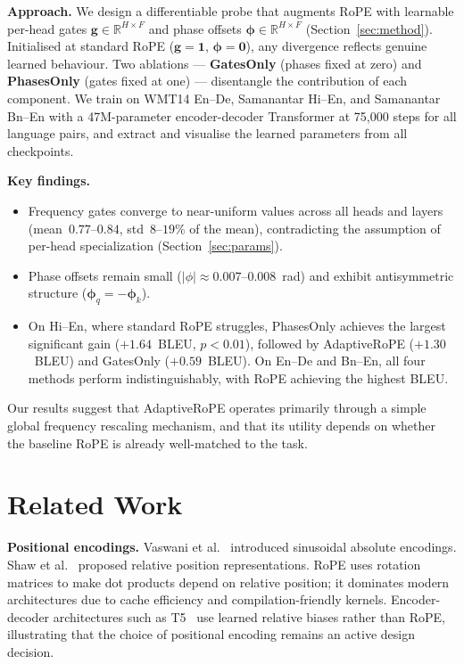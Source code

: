 \documentclass[conference]{IEEEtran}
\begin{document}
\textbf{Approach.} We design a differentiable probe that augments RoPE with
learnable per-head gates $\mathbf{g} \in \mathbb{R}^{H \times F}$ and phase
offsets $\boldsymbol{\phi} \in \mathbb{R}^{H \times F}$
(Section~\ref{sec:method}). Initialised at standard RoPE ($\mathbf{g}=\mathbf{1}$,
$\boldsymbol{\phi}=\mathbf{0}$), any divergence reflects genuine learned
behaviour. Two ablations --- \textbf{GatesOnly} (phases fixed at zero) and
\textbf{PhasesOnly} (gates fixed at one) --- disentangle the contribution of
each component. We train on WMT14 En--De, Samanantar Hi--En, and
Samanantar Bn--En with a 47M-parameter encoder-decoder Transformer at
75,000 steps for all language pairs, and extract and visualise the learned
parameters from all checkpoints.

\textbf{Key findings.}
\begin{itemize}
  \item Frequency gates converge to near-uniform values across all heads and
        layers (mean~$0.77$--$0.84$, std~$8$--$19\%$ of the mean),
        contradicting the assumption of per-head specialization
        (Section~\ref{sec:params}).
  \item Phase offsets remain small ($|\phi| \approx 0.007$--$0.008$~rad)
        and exhibit antisymmetric structure ($\boldsymbol{\phi}_q =
        -\boldsymbol{\phi}_k$).
  \item On Hi--En, where standard RoPE struggles, PhasesOnly achieves the
        largest significant gain ($+1.64$~BLEU, $p<0.01$), followed by
        AdaptiveRoPE ($+1.30$~BLEU) and GatesOnly ($+0.59$~BLEU).
        On En--De and Bn--En, all four methods perform indistinguishably,
        with RoPE achieving the highest BLEU.
\end{itemize}

Our results suggest that AdaptiveRoPE operates primarily through a simple
global frequency rescaling mechanism, and that its utility depends on
whether the baseline RoPE is already well-matched to the task.

\section{Related Work}
\label{sec:related}

\textbf{Positional encodings.} Vaswani et al.~\cite{vaswani2017attention}
introduced sinusoidal absolute encodings. Shaw et al.~\cite{shaw2018self}
proposed relative position representations. RoPE
\cite{su2021roformer} uses rotation matrices to make dot products depend on
relative position; it dominates modern architectures due to cache efficiency
and compilation-friendly kernels. Encoder-decoder architectures such as
T5~\cite{raffel2020exploring} use learned relative biases rather than RoPE,
illustrating that the choice of positional encoding remains an active design
decision.
\end{document}
